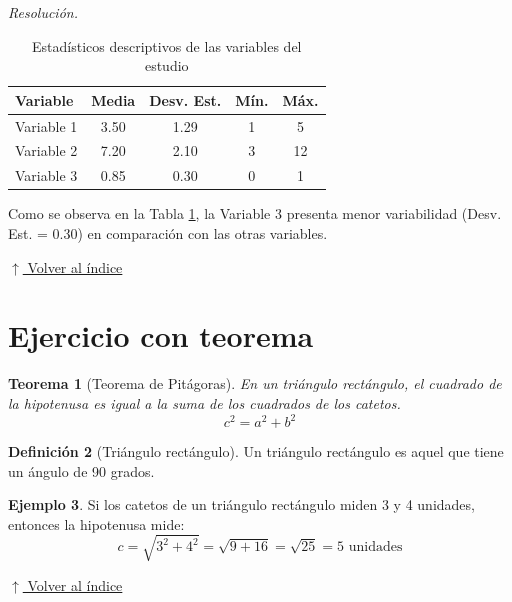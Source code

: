 \documentclass[12pt]{article}
\newtheorem{teorema}{Teorema}[section]
\theoremstyle{definition}
\newtheorem{definicion}[teorema]{Definición}
\newtheorem{ejemplo}[teorema]{Ejemplo}
\theoremstyle{remark}
\newcounter{ejercicio}[section]
\newenvironment{resolucion}{%
    \par\vspace{0.3em}%
    \noindent\textit{Resolución.}\quad
}{%
    \par\vspace{0.8em}%
}
\newcommand{\volverindice}{%
    \vspace{1em}%
    \begin{flushright}%
        \hyperlink{indice}{\small $\uparrow$ Volver al índice}%
    \end{flushright}%
}
\begin{document}
\begin{resolucion}

\begin{table}[H]
    \centering
    \caption{Estadísticos descriptivos de las variables del estudio}
    \label{tab:estadisticos}
    \begin{tabular}{lcccc}
        \toprule
        \textbf{Variable} & \textbf{Media} & \textbf{Desv. Est.} & \textbf{Mín.} & \textbf{Máx.} \\
        \midrule
        Variable 1 & 3.50 & 1.29 & 1 & 5 \\
        Variable 2 & 7.20 & 2.10 & 3 & 12 \\
        Variable 3 & 0.85 & 0.30 & 0 & 1 \\
        \bottomrule
    \end{tabular}
\end{table}

Como se observa en la Tabla \ref{tab:estadisticos}, la Variable 3 presenta menor variabilidad (Desv. Est. = 0.30) en comparación con las otras variables.

\end{resolucion}

\volverindice
\newpage

\section{Ejercicio con teorema}

\begin{teorema}[Teorema de Pitágoras]
En un triángulo rectángulo, el cuadrado de la hipotenusa es igual a la suma de los cuadrados de los catetos.
\[
    c^2 = a^2 + b^2
\]
\end{teorema}

\begin{definicion}[Triángulo rectángulo]
Un triángulo rectángulo es aquel que tiene un ángulo de 90 grados.
\end{definicion}

\begin{ejemplo}
Si los catetos de un triángulo rectángulo miden 3 y 4 unidades, entonces la hipotenusa mide:
\[
    c = \sqrt{3^2 + 4^2} = \sqrt{9 + 16} = \sqrt{25} = 5 \text{ unidades}
\]
\end{ejemplo}

\volverindice

\end{document}
